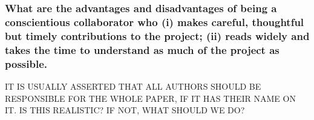 \documentclass[12pt]{beamer}
\begin{document}
\begin{frame} %
\frametitle{ What are the advantages and disadvantages of being a conscientious collaborator who (i) makes careful, thoughtful but timely contributions to the project; (ii) reads widely and takes the time to understand as much of the project as possible.
}



\end{frame}
\begin{frame}


    IT IS USUALLY ASSERTED THAT ALL  AUTHORS SHOULD BE RESPONSIBLE FOR THE WHOLE PAPER, IF IT HAS THEIR NAME ON IT. IS THIS REALISTIC? IF NOT, WHAT SHOULD WE DO?

\end{frame}
\end{document}
